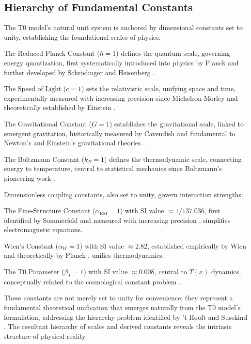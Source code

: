 \documentclass[twocolumn,aps,prl]{revtex4-2}
\begin{document}
	\subsection{Hierarchy of Fundamental Constants}
	\label{subsec:level1}
	
	The T0 model’s natural unit system is anchored by dimensional constants set to unity, establishing the foundational scales of physics.
	
	The Reduced Planck Constant ($\hbar = 1$) defines the quantum scale, governing energy quantization, first systematically introduced into physics by Planck \cite{Planck1901} and further developed by Schrödinger \cite{Schrodinger1926b} and Heisenberg \cite{Heisenberg1925}.
	
	The Speed of Light ($c = 1$) sets the relativistic scale, unifying space and time, experimentally measured with increasing precision since Michelson-Morley \cite{Michelson1887} and theoretically established by Einstein \cite{Einstein1905}.
	
	The Gravitational Constant ($G = 1$) establishes the gravitational scale, linked to emergent gravitation, historically measured by Cavendish \cite{Cavendish1798} and fundamental to Newton’s \cite{Newton1687} and Einstein’s gravitational theories \cite{Einstein1916}.
	
	The Boltzmann Constant ($k_B = 1$) defines the thermodynamic scale, connecting energy to temperature, central to statistical mechanics since Boltzmann’s pioneering work \cite{Boltzmann1872}.
	
	Dimensionless coupling constants, also set to unity, govern interaction strengths:
	
	The Fine-Structure Constant ($\alpha_{\text{EM}} = 1$) with SI value $\approx 1/137.036$, first identified by Sommerfeld \cite{Sommerfeld1916} and measured with increasing precision \cite{Aoyama2018}, simplifies electromagnetic equations.
	
	Wien’s Constant ($\alpha_W = 1$) with SI value $\approx 2.82$, established empirically by Wien \cite{Wien1896} and theoretically by Planck \cite{Planck1901}, unifies thermodynamics.
	
	The T0 Parameter ($\beta_T = 1$) with SI value $\approx 0.008$, central to $T(x)$ dynamics, conceptually related to the cosmological constant problem \cite{Weinberg1989, Martin2012}.
	
	These constants are not merely set to unity for convenience; they represent a fundamental theoretical unification that emerges naturally from the T0 model’s formulation, addressing the hierarchy problem identified by ’t Hooft \cite{tHooft1980} and Susskind \cite{Susskind1979}. The resultant hierarchy of scales and derived constants reveals the intrinsic structure of physical reality.
	
\end{document}
